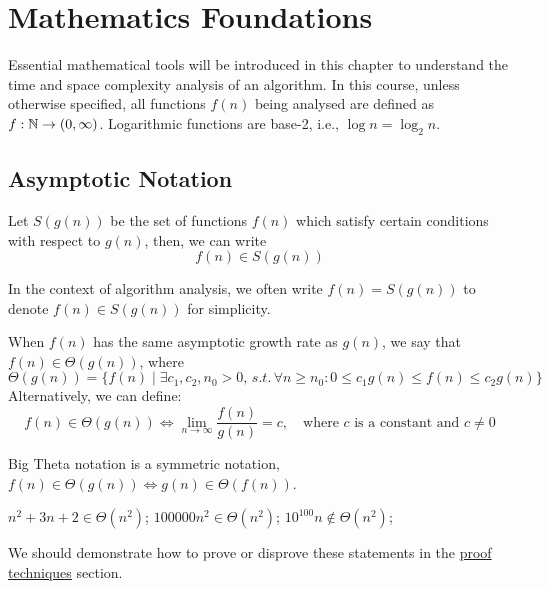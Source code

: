 \chapter{Mathematics Foundations}

Essential mathematical tools will be introduced in this chapter to understand the time and space complexity analysis of an algorithm.
In this course, unless otherwise specified, all functions $f(n)$ being analysed are defined as $f: \operatorname{\mathbb{N}} \to (0, \infty)$.
Logarithmic functions are base-2, i.e., $\log n = \log_2 n$.

\section{Asymptotic Notation}

\begin{definition}\label{def:asymptotic-notation}
    Let $S(g(n))$ be the set of functions $f(n)$ which satisfy certain conditions with respect to $g(n)$, then, we can write \[
        f(n) \in S(g(n))
    \]
\end{definition}

\begin{remark}
    In the context of algorithm analysis, we often write $f(n) = S(g(n))$ to denote $f(n) \in S(g(n))$ for simplicity.
\end{remark}

\begin{definition}\label{def:big-theta-notation}
    When $f(n)$ has the same asymptotic growth rate as $g(n)$, we say that $f(n)\in\Theta(g(n))$, where
    \[
        \Theta(g(n)) = \{f(n) \mid \exists c_1, c_2, n_0 > 0,\, s.t.\, \forall n\geq n_0 : 0 \leq c_1g(n)\leq f(n) \leq c_2g(n)\}
    \]
    Alternatively, we can define:
    \[
        f(n)\in\Theta(g(n)) \Longleftrightarrow \lim_{n\to\infty} \frac{f(n)}{g(n)} = c, \quad\text{where } c \text{ is a constant and } c \neq 0
    \]
\end{definition}

\begin{remark}
    Big Theta notation is a symmetric notation, $f(n)\in\Theta(g(n)) \Longleftrightarrow g(n)\in\Theta(f(n))$.
\end{remark}

\begin{example}
    $n^2 + 3n + 2 \in \Theta(n^2)$; \quad
    $100000n^2 \in \Theta(n^2)$; \quad
    $10^{100}n \notin \Theta(n^2)$;

    We should demonstrate how to prove or disprove these statements in the \hyperref[subsec:proof-techniques]{proof techniques} section.
\end{example}

